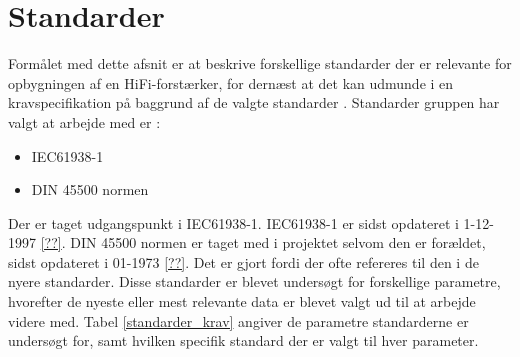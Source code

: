 \section{Standarder}
Formålet med dette afsnit er at beskrive forskellige standarder der er relevante for opbygningen af en HiFi-forstærker, for dernæst at det kan udmunde i en kravspecifikation på baggrund af de valgte standarder . Standarder gruppen har valgt at arbejde med er :

\begin{itemize}              
\item IEC61938-1             
\item DIN 45500 normen    
\end{itemize} 

Der er taget udgangspunkt i IEC61938-1. IEC61938-1 er sidst opdateret i 1-12-1997 \ref{??}. DIN 45500 normen er taget med i projektet selvom den er forældet, sidst opdateret i 01-1973 \ref{??}. Det er gjort fordi der ofte refereres til den i de nyere standarder. Disse standarder er blevet undersøgt for forskellige parametre, hvorefter de nyeste eller mest relevante data er blevet valgt ud til at arbejde videre med.
\newline
\newline
Tabel \ref{standarder_krav} angiver de parametre standarderne er undersøgt for, samt hvilken specifik standard der er valgt til hver parameter.
 
